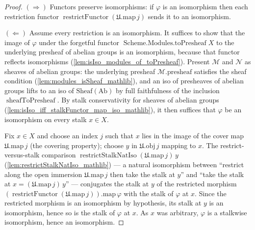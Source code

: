 \begin{proof}
  \((\Rightarrow)\) Functors preserve isomorphisms: if \(\varphi\) is an isomorphism then each
  restriction functor \(\operatorname{restrictFunctor}(\mathfrak{U}.\mathrm{map}\,j)\) sends it to
  an isomorphism.

  \((\Leftarrow)\) Assume every restriction is an isomorphism. It suffices to show that the image
  of \(\varphi\) under the forgetful functor \(\operatorname{Scheme.Modules.toPresheaf} X\) to the
  underlying presheaf of abelian groups is an isomorphism, because that functor reflects
  isomorphisms (\cref{lem:isIso_modules_of_toPresheaf}). Present \(\mathcal{M}\) and
  \(\mathcal{N}\) as sheaves of abelian groups: the underlying presheaf \(\mathcal{M}.\mathrm{presheaf}\)
  satisfies the sheaf condition (\cref{lem:modules_isSheaf_mathlib}), and an iso of presheaves of
  abelian groups lifts to an iso of \(\mathrm{Sheaf}(\mathrm{Ab})\) by full faithfulness of the
  inclusion \(\operatorname{sheafToPresheaf}\). By stalk conservativity for sheaves of abelian
  groups (\cref{lem:isIso_iff_stalkFunctor_map_iso_mathlib}), it then suffices that \(\varphi\) be
  an isomorphism on every stalk \(x \in X\).

  Fix \(x \in X\) and choose an index \(j\) such that \(x\) lies in the image of the cover map
  \(\mathfrak{U}.\mathrm{map}\,j\) (the covering property); choose \(y\) in
  \(\mathfrak{U}.\mathrm{obj}\,j\) mapping to \(x\). The restrict-versus-stalk comparison
  \(\operatorname{restrictStalkNatIso}(\mathfrak{U}.\mathrm{map}\,j)\,y\)
  (\cref{lem:restrictStalkNatIso_mathlib}) --- a natural isomorphism between ``restrict along the
  open immersion \(\mathfrak{U}.\mathrm{map}\,j\) then take the stalk at \(y\)'' and ``take the
  stalk at \(x = (\mathfrak{U}.\mathrm{map}\,j)\,y\)'' --- conjugates the stalk at \(y\) of the
  restricted morphism \((\operatorname{restrictFunctor}(\mathfrak{U}.\mathrm{map}\,j)).\mathrm{map}\,\varphi\)
  with the stalk of \(\varphi\) at \(x\). Since the restricted morphism is an
  isomorphism by hypothesis, its stalk at \(y\) is an isomorphism, hence so is the stalk of
  \(\varphi\) at \(x\). As \(x\) was arbitrary, \(\varphi\) is a stalkwise isomorphism, hence an
  isomorphism.
\end{proof}

